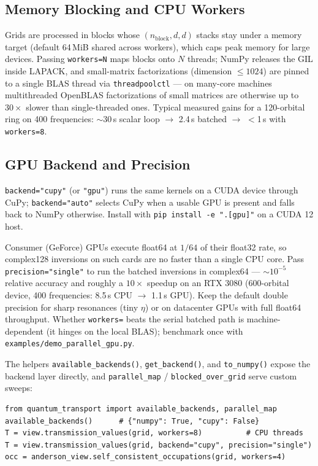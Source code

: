 \documentclass[11pt,a4paper]{article}
\begin{document}
\subsection{Memory Blocking and CPU Workers}
Grids are processed in blocks whose $(n_{\mathrm{block}},d,d)$ stacks stay under a
memory target (default 64\,MiB shared across workers), which caps peak memory for
large devices. Passing \texttt{workers=N} maps blocks onto $N$ threads; NumPy
releases the GIL inside LAPACK, and small-matrix factorizations (dimension
$\le 1024$) are pinned to a single BLAS thread via \texttt{threadpoolctl} --- on
many-core machines multithreaded OpenBLAS factorizations of small matrices are
otherwise up to $30\times$ slower than single-threaded ones. Typical measured
gains for a 120-orbital ring on 400 frequencies: $\sim$30\,s scalar loop
$\rightarrow$ 2.4\,s batched $\rightarrow$ $<$1\,s with \texttt{workers=8}.

\subsection{GPU Backend and Precision}
\texttt{backend="cupy"} (or \texttt{"gpu"}) runs the same kernels on a CUDA device
through CuPy; \texttt{backend="auto"} selects CuPy when a usable GPU is present
and falls back to NumPy otherwise. Install with
\texttt{pip install -e ".[gpu]"} on a CUDA 12 host.

Consumer (GeForce) GPUs execute float64 at $1/64$ of their float32 rate, so
complex128 inversions on such cards are no faster than a single CPU core. Pass
\texttt{precision="single"} to run the batched inversions in complex64 —
$\sim 10^{-5}$ relative accuracy and roughly a $10\times$ speedup on an RTX 3080
(600-orbital device, 400 frequencies: 8.5\,s CPU $\rightarrow$ 1.1\,s GPU).
Keep the default double precision for sharp resonances (tiny $\eta$) or on
datacenter GPUs with full float64 throughput. Whether \texttt{workers=} beats
the serial batched path is machine-dependent (it hinges on the local BLAS);
benchmark once with \texttt{examples/demo\_parallel\_gpu.py}.

The helpers \texttt{available\_backends()}, \texttt{get\_backend()}, and
\texttt{to\_numpy()} expose the backend layer directly, and
\texttt{parallel\_map} / \texttt{blocked\_over\_grid} serve custom sweeps:
\begin{lstlisting}[style=py]
from quantum_transport import available_backends, parallel_map
available_backends()      # {"numpy": True, "cupy": False}
T = view.transmission_values(grid, workers=8)          # CPU threads
T = view.transmission_values(grid, backend="cupy", precision="single")
occ = anderson_view.self_consistent_occupations(grid, workers=4)
\end{lstlisting}
\end{document}
